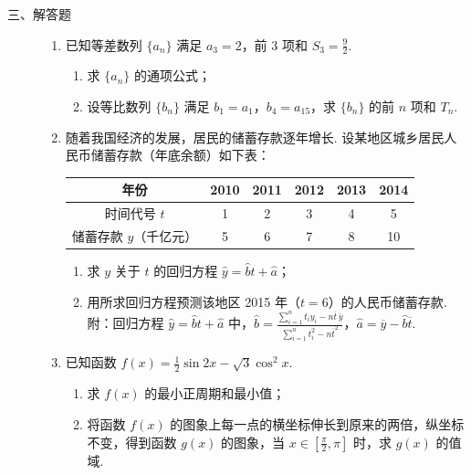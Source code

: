 \begin{description}

    \item[三、解答题]

    \begin{enumerate}[leftmargin=5pt]

      \addtocounter{enumi}{+15}

        \item 已知等差数列 \(\{a_{n}\}\) 满足 \(a_3 = 2\)，前 3 项和 \(S_3 = \frac{9}{2}\).

\begin{enumerate}
\item 求 \(\{a_{n}\}\) 的通项公式；
\item 设等比数列 \(\{b_{n}\}\) 满足 \(b_1 = a_1\)，\(b_4 = a_{15}\)，求 \(\{b_{n}\}\) 的前 \(n\) 项和 \(T_n\).
\end{enumerate}

        \item 随着我国经济的发展，居民的储蓄存款逐年增长. 设某地区城乡居民人民币储蓄存款（年底余额）如下表：

\begin{center}
\renewcommand{\arraystretch}{1.15}
\begin{tabular}{|c|ccccc|}
\hline
年份 & 2010 & 2011 & 2012 & 2013 & 2014 \\
\hline
时间代号 \(t\) & 1 & 2 & 3 & 4 & 5 \\
\hline
储蓄存款 \(y\)（千亿元） & 5 & 6 & 7 & 8 & 10 \\
\hline
\end{tabular}
\end{center}

\begin{enumerate}
\item 求 \(y\) 关于 \(t\) 的回归方程 \(\hat{y} = \hat{b} t + \hat{a}\)；
\item 用所求回归方程预测该地区 2015 年（\(t = 6\)）的人民币储蓄存款. 附：回归方程 \(\hat{y} = \hat{b} t + \hat{a}\) 中，\(\hat{b} = \frac{\sum_{i=1}^{n} t_{i} y_{i} - n \overline{t} \, \overline{y}}{\sum_{i=1}^{n} t_{i}^{2} - n \overline{t}^{2}}\)，\(\hat{a} = \overline{y} - \hat{b} \overline{t}\).
\end{enumerate}

        \item 已知函数 \(f(x) = \frac{1}{2}\sin 2x - \sqrt{3}\cos^2 x\).

\begin{enumerate}
\item 求 \(f(x)\) 的最小正周期和最小值；
\item 将函数 \(f(x)\) 的图象上每一点的横坐标伸长到原来的两倍，纵坐标不变，得到函数 \(g(x)\) 的图象，当 \(x \in \left[\frac{\pi}{2}, \pi\right]\) 时，求 \(g(x)\) 的值域.
\end{enumerate}


\end{enumerate}
\end{description}
